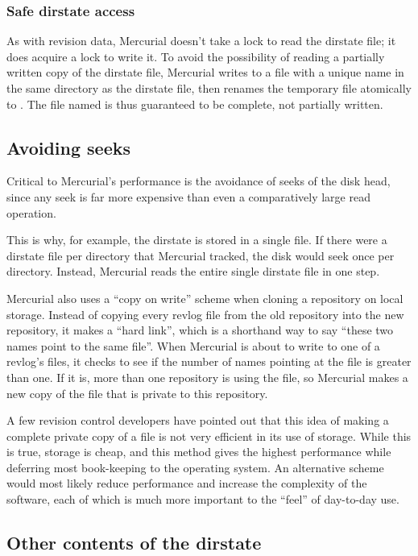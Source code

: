 \subsubsection{Safe dirstate access}

As with revision data, Mercurial doesn't take a lock to read the
dirstate file; it does acquire a lock to write it.  To avoid the
possibility of reading a partially written copy of the dirstate file,
Mercurial writes to a file with a unique name in the same directory as
the dirstate file, then renames the temporary file atomically to
.  The file named  is thus
guaranteed to be complete, not partially written.

\subsection{Avoiding seeks}

Critical to Mercurial's performance is the avoidance of seeks of the
disk head, since any seek is far more expensive than even a
comparatively large read operation.

This is why, for example, the dirstate is stored in a single file.  If
there were a dirstate file per directory that Mercurial tracked, the
disk would seek once per directory.  Instead, Mercurial reads the
entire single dirstate file in one step.

Mercurial also uses a ``copy on write'' scheme when cloning a
repository on local storage.  Instead of copying every revlog file
from the old repository into the new repository, it makes a ``hard
link'', which is a shorthand way to say ``these two names point to the
same file''.  When Mercurial is about to write to one of a revlog's
files, it checks to see if the number of names pointing at the file is
greater than one.  If it is, more than one repository is using the
file, so Mercurial makes a new copy of the file that is private to
this repository.

A few revision control developers have pointed out that this idea of
making a complete private copy of a file is not very efficient in its
use of storage.  While this is true, storage is cheap, and this method
gives the highest performance while deferring most book-keeping to the
operating system.  An alternative scheme would most likely reduce
performance and increase the complexity of the software, each of which
is much more important to the ``feel'' of day-to-day use.

\subsection{Other contents of the dirstate}

